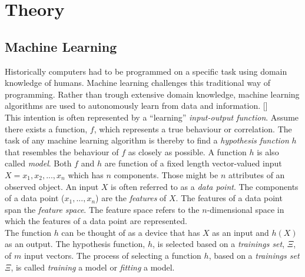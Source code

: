 \chapter{Theory}
\label{ch:Theory}
\section{Machine Learning}
Historically computers had to be programmed on a specific task using domain knowledge of humans. Machine learning challenges this traditional way of programming. Rather than trough extensive domain knowledge, machine learning algorithms are used to autonomously learn from data and information. []
\\

This intention is often represented by a ``learning'' \emph{input-output function}. Assume there exists a function, $f$, which represents a true behaviour or correlation. The task of any machine learning algorithm is thereby to find a \emph{hypothesis function} $h$ that resembles the behaviour of $f$ as closely as possible. A function $h$ is also called \emph{model}. Both $f$ and $h$ are function of a fixed length vector-valued input $X={x_1, x_2, ... , x_n}$ which has $n$ components. Those might be $n$ attributes of an observed object. An input $X$ is often referred to as a \emph{data point}. The components of a data point ($x_1, ..., x_n$) are the \emph{features} of $X$. 
The features of a data point span the \emph{feature space}. The feature space refers to the $n$-dimensional space in which the features of a data point are represented.
\\
The function $h$ can be thought of as a device that has $X$ as an input and $h(X)$ as an output. The hypothesis function, $h$, is selected based on a \emph{trainings set}, $\Xi$, of $m$ input vectors. The process of selecting a function $h$, based on a \emph{trainings set} $\Xi$, is called \emph{training} a model or \emph{fitting} a model.
\\

